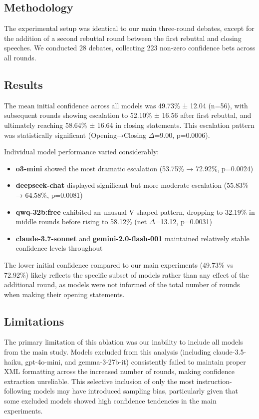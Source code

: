 \documentclass{article}
\begin{document}
\subsection{Methodology}
The experimental setup was identical to our main three-round debates, except for the addition of a second rebuttal round between the first rebuttal and closing speeches. We conducted 28 debates, collecting 223 non-zero confidence bets across all rounds.

\subsection{Results}
The mean initial confidence across all models was 49.73\% ± 12.04 (n=56), with subsequent rounds showing escalation to 52.10\% ± 16.56 after first rebuttal, and ultimately reaching 58.64\% ± 16.64 in closing statements. This escalation pattern was statistically significant (Opening→Closing $\Delta$=9.00, p=0.0006).

Individual model performance varied considerably:

\begin{itemize}
    \item \textbf{o3-mini} showed the most dramatic escalation (53.75\% → 72.92\%, p=0.0024)
    \item \textbf{deepseek-chat} displayed significant but more moderate escalation (55.83\% → 64.58\%, p=0.0081)
    \item \textbf{qwq-32b:free} exhibited an unusual V-shaped pattern, dropping to 32.19\% in middle rounds before rising to 58.12\% (net $\Delta$=13.12, p=0.0031)
    \item \textbf{claude-3.7-sonnet} and \textbf{gemini-2.0-flash-001} maintained relatively stable confidence levels throughout
\end{itemize}

The lower initial confidence compared to our main experiments (49.73\% vs 72.92\%) likely reflects the specific subset of models rather than any effect of the additional round, as models were not informed of the total number of rounds when making their opening statements.

\subsection{Limitations}
The primary limitation of this ablation was our inability to include all models from the main study. Models excluded from this analysis (including claude-3.5-haiku, gpt-4o-mini, and gemma-3-27b-it) consistently failed to maintain proper XML formatting across the increased number of rounds, making confidence extraction unreliable. This selective inclusion of only the most instruction-following models may have introduced sampling bias, particularly given that some excluded models showed high confidence tendencies in the main experiments.
\end{document}
